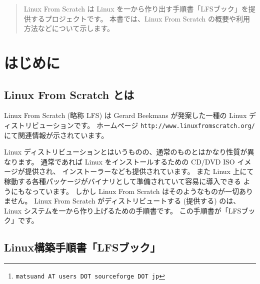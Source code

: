 \documentclass{lfsread}
\begin{document}
\author{松 山 道 夫\thanks{\texttt{matsuand AT users DOT sourceforge DOT jp}}}
\date{2013年9月xx日}
\maketitle

\begin{abstract}
Linux From Scratch は Linux を一から作り出す手順書「LFSブック」を提供するプロジェクトです。
本書では、Linux From Scratch の概要や利用方法などについて示します。
\end{abstract}

\section{はじめに}

\subsection{Linux From Scratch とは}

Linux From Scratch (略称 LFS) は Gerard Beekmans が発案した一種の Linux ディストリビューションです。
ホームページ \texttt{http://www.linuxfromscratch.org/} にて関連情報が示されています。

Linux ディストリビューションとはいうものの、通常のものとはかなり性質が異なります。
通常であれば Linux をインストールするための CD/DVD ISO イメージが提供され、
インストーラーなども提供されています。
また Linux 上にて稼動する各種パッケージがバイナリとして準備されていて容易に導入できる
ようにもなっています。
しかし Linux From Scratch はそのようなものが一切ありません。
Linux From Scratch がディストリビュートする (提供する) のは、
Linux システムを一から作り上げるための手順書です。
この手順書が「LFSブック」です。

\subsection{Linux構築手順書「LFSブック」}
\end{document}
